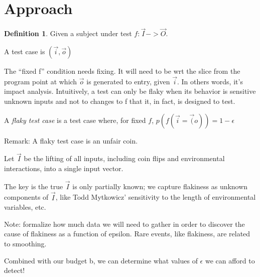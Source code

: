 \section{Approach}
\label{sec:approach}

\theoremstyle{definition}
\newtheorem{defn}{Definition}[section]


\begin{defn}
	Given a subject under test $f: \vec{I} -> \vec{O}$.

	A test case is $(\vec{i},\vec{o})$

	The “fixed f” condition needs fixing.  It will need to be wrt the slice from the program point at which $\vec{o}$ is generated to entry, given $\vec{i}$. In others words, it’s impact analysis.  Intuitively, a test can only be flaky when its behavior is sensitive unknown inputs and not to changes to f that it, in fact, is designed to test.

	A \emph{flaky test case} is a test case where, for fixed $f$,
	$p(f(\vec{i} = \vec(o)) = 1 - \epsilon$

	Remark: A flaky test case is an unfair coin.

	Let $\vec{I}$ be the lifting of all inputs, including coin flips and environmental interactions, into a single input vector.

	The key is the true $\vec{I}$ is only partially known;  we capture flakiness as unknown components of $\vec{I}$, like Todd Mytkowicz’ sensitivity to the length of environmental variables, etc.

	Note:  formalize how much data we will need to gather in order to discover the cause of flakiness as a function of epsilon.  Rare events, like flakiness, are related to smoothing.

	Combined with our budget b, we can determine what values of $\epsilon$ we can afford to detect!
\end{defn}

